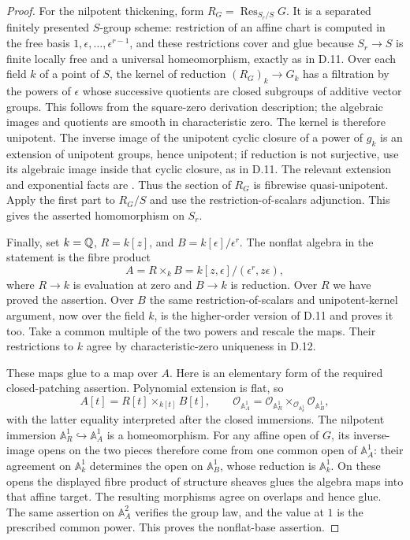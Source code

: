 \begin{proof}
For the nilpotent thickening, form
$R_G=\operatorname{Res}_{S_r/S}G$. It is a separated finitely presented
$S$-group scheme: restriction of an affine chart is computed in the
free basis $1,\epsilon,\ldots,\epsilon^{r-1}$, and these restrictions
cover and glue because $S_r\to S$ is finite locally free and a
universal homeomorphism, exactly as in D.11. Over each field $k$
of a point of $S$, the kernel of reduction
$(R_G)_k\to G_k$ has a filtration by the powers of $\epsilon$ whose
successive quotients are closed subgroups of additive vector groups.
This follows from the square-zero derivation description; the algebraic
images and quotients are smooth in characteristic zero. The kernel is
therefore unipotent. The inverse image of the unipotent cyclic closure
of a power of $g_k$ is an extension of unipotent groups, hence
unipotent; if reduction is not surjective, use its algebraic image
inside that cyclic closure, as in D.11. The relevant extension and
exponential facts are \citet[Corollary 14.7 and Proposition 14.32]{D_Milne2022}.
Thus the section of $R_G$ is fibrewise quasi-unipotent.
Apply the first part to $R_G/S$ and use the restriction-of-scalars
adjunction. This gives the asserted homomorphism on $S_r$.

Finally, set $k=\mathbb Q$, $R=k[z]$, and $B=k[\epsilon]/\epsilon^r$.
The nonflat algebra in the statement is the fibre product
\[
       A=R\times_k B=k[z,\epsilon]/(\epsilon^r,z\epsilon),
\]
where $R\to k$ is evaluation at zero and $B\to k$ is reduction.
Over $R$ we have proved the assertion. Over $B$ the same
restriction-of-scalars and unipotent-kernel argument, now over the
field $k$, is the higher-order version of D.11 and proves it too.
Take a common multiple of the two powers and rescale the maps.
Their restrictions to $k$ agree by characteristic-zero uniqueness
in D.12.

These maps glue to a map over $A$. Here is an elementary form of
the required closed-patching assertion. Polynomial extension is
flat, so
\[
 A[t]=R[t]\times_{k[t]}B[t],\qquad
 \mathcal O_{\mathbb A^1_A}
 =\mathcal O_{\mathbb A^1_R}
   \times_{\mathcal O_{\mathbb A^1_k}}
    \mathcal O_{\mathbb A^1_B},
\]
with the latter equality interpreted after the closed immersions.
The nilpotent immersion $\mathbb A^1_R\hookrightarrow\mathbb A^1_A$
is a homeomorphism. For any affine open of $G$, its inverse-image
opens on the two pieces therefore come from one common open of
$\mathbb A^1_A$: their agreement on $\mathbb A^1_k$ determines the
open on $\mathbb A^1_B$, whose reduction is $\mathbb A^1_k$.
On these opens the displayed fibre product of structure sheaves
glues the algebra maps into that affine target. The resulting
morphisms agree on overlaps and hence glue. The same assertion on
$\mathbb A^2_A$ verifies the group law, and the value at $1$ is the
prescribed common power. This proves the nonflat-base assertion.
\end{proof}

